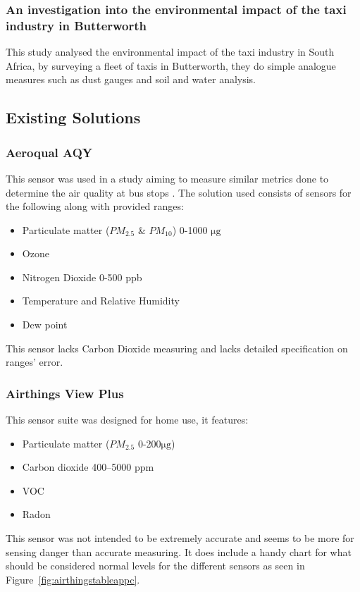 \subsubsection{An investigation into the environmental impact of the taxi industry in Butterworth \cite{Environmentalimpact}}
This study analysed the environmental impact of the taxi industry in South Africa, by surveying a fleet of taxis in Butterworth, they do simple analogue measures such as dust gauges and soil and water analysis. 


\subsection{Existing Solutions}

\subsubsection{Aeroqual AQY}
This sensor was used in a study aiming to measure similar metrics done to determine the air quality at bus stops \cite{busstop}. 
The solution used consists of sensors for the following along with provided ranges\cite{sensoraq}:

\begin{itemize}
	\item Particulate matter ($PM_{2.5}$ \& $PM_{10}$) 0-1000 $ \si{\micro\gram}$
	\item Ozone
	\item Nitrogen Dioxide 0-500 ppb
	\item Temperature and Relative Humidity
	\item Dew point
\end{itemize}
This sensor lacks Carbon Dioxide measuring and lacks detailed specification on ranges' error.


\subsubsection{Airthings View Plus}
This sensor suite was designed for home use, it features:
\begin{itemize}
	\item Particulate matter ($PM_{2.5}$ 0-200$ \si{\micro\gram}$)
	\item Carbon dioxide 400–5000 ppm
	\item VOC
	\item Radon
\end{itemize}
This sensor was not intended to be extremely accurate and seems to be more for sensing danger than accurate measuring.
It does include a handy chart for what should be considered normal levels for the different sensors as seen in Figure~\ref{fig:airthingstableappc}.





